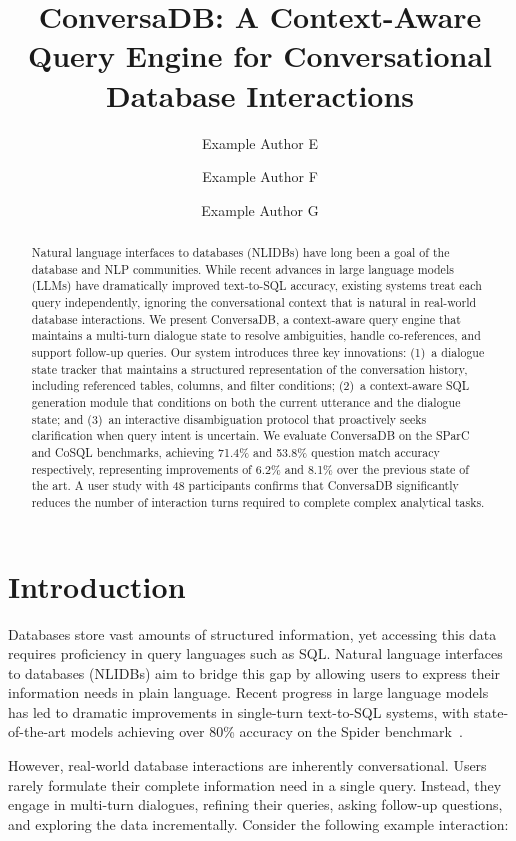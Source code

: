 \documentclass[sigconf,nonacm]{acmart}
\title{ConversaDB: A Context-Aware Query Engine for Conversational Database Interactions}
\author{Example Author E}
\affiliation{
  \institution{University of Washington}
  \department{Paul G. Allen School of Computer Science}
  \city{Seattle}
  \state{WA}
  \country{USA}
}
\author{Example Author F}
\affiliation{
  \institution{ETH Zurich}
  \department{Department of Computer Science}
  \city{Zurich}
  \country{Switzerland}
}
\author{Example Author G}
\affiliation{
  \institution{Microsoft Research}
  \city{Redmond}
  \state{WA}
  \country{USA}
}
\begin{document}
\begin{abstract}
Natural language interfaces to databases (NLIDBs) have long been a goal of the database and NLP communities. While recent advances in large language models (LLMs) have dramatically improved text-to-SQL accuracy, existing systems treat each query independently, ignoring the conversational context that is natural in real-world database interactions. We present ConversaDB, a context-aware query engine that maintains a multi-turn dialogue state to resolve ambiguities, handle co-references, and support follow-up queries. Our system introduces three key innovations: (1)~a dialogue state tracker that maintains a structured representation of the conversation history, including referenced tables, columns, and filter conditions; (2)~a context-aware SQL generation module that conditions on both the current utterance and the dialogue state; and (3)~an interactive disambiguation protocol that proactively seeks clarification when query intent is uncertain. We evaluate ConversaDB on the SParC and CoSQL benchmarks, achieving 71.4\% and 53.8\% question match accuracy respectively, representing improvements of 6.2\% and 8.1\% over the previous state of the art. A user study with 48 participants confirms that ConversaDB significantly reduces the number of interaction turns required to complete complex analytical tasks.
\end{abstract}


\maketitle

\section{Introduction}

Databases store vast amounts of structured information, yet accessing this data requires proficiency in query languages such as SQL. Natural language interfaces to databases (NLIDBs) aim to bridge this gap by allowing users to express their information needs in plain language. Recent progress in large language models has led to dramatic improvements in single-turn text-to-SQL systems, with state-of-the-art models achieving over 80\% accuracy on the Spider benchmark~\cite{yu2018spider}.

However, real-world database interactions are inherently conversational. Users rarely formulate their complete information need in a single query. Instead, they engage in multi-turn dialogues, refining their queries, asking follow-up questions, and exploring the data incrementally. Consider the following example interaction:
\end{document}
